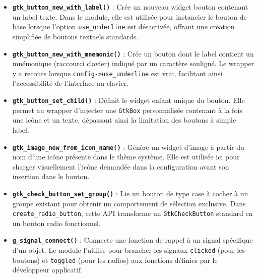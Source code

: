 \begin{itemize}
    \item \textbf{\texttt{gtk\_button\_new\_with\_label()}} : Crée un nouveau widget bouton contenant un label texte. Dans le module, elle est utilisée pour instancier le bouton de base lorsque l'option \texttt{use\_underline} est désactivée, offrant une création simplifiée de boutons textuels standards.
    \item \textbf{\texttt{gtk\_button\_new\_with\_mnemonic()}} : Crée un bouton dont le label contient un mnémonique (raccourci clavier) indiqué par un caractère souligné. Le wrapper y a recours lorsque \texttt{config->use\_underline} est vrai, facilitant ainsi l'accessibilité de l'interface au clavier.
    \item \textbf{\texttt{gtk\_button\_set\_child()}} : Définit le widget enfant unique du bouton. Elle permet au wrapper d'injecter une \texttt{GtkBox} personnalisée contenant à la fois une icône et un texte, dépassant ainsi la limitation des boutons à simple label.
    \item \textbf{\texttt{gtk\_image\_new\_from\_icon\_name()}} : Génère un widget d'image à partir du nom d'une icône présente dans le thème système. Elle est utilisée ici pour charger visuellement l'icône demandée dans la configuration avant son insertion dans le bouton.
    \item \textbf{\texttt{gtk\_check\_button\_set\_group()}} : Lie un bouton de type case à cocher à un groupe existant pour obtenir un comportement de sélection exclusive. Dans \texttt{create\_radio\_button}, cette API transforme un \texttt{GtkCheckButton} standard en un bouton radio fonctionnel.
    \item \textbf{\texttt{g\_signal\_connect()}} : Connecte une fonction de rappel à un signal spécifique d'un objet. Le module l'utilise pour brancher les signaux \texttt{clicked} (pour les boutons) et \texttt{toggled} (pour les radios) aux fonctions définies par le développeur applicatif.
\end{itemize}

\newpage
